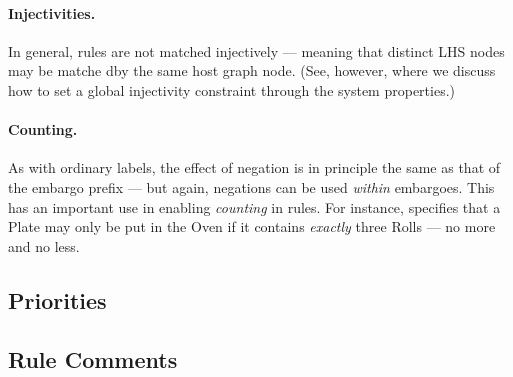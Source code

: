 \paragraph{Injectivities.}

In general, rules are not matched injectively --- meaning that distinct LHS
nodes may be matche dby the same host graph node. (See, however,
 where we discuss how to set a global injectivity
constraint through the system properties.)

\paragraph{Counting.}

As with ordinary labels, the effect of negation is in principle the same as
that of the embargo prefix --- but again, negations can be used \emph{within}
embargoes. This has an important use in enabling \emph{counting} in rules. For
instance,  specifies that a \textsf{Plate} may only be put in
the \textsf{Oven} if it contains \emph{exactly} three \textsf{Roll}s --- no
more and no less.


\subsection{Priorities}

\subsection{Rule Comments}
